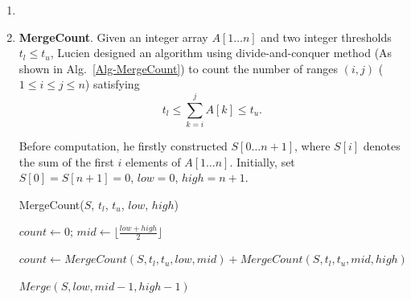 \documentclass[12pt,a4paper]{article}
\makeatletter
\newtheorem*{solution}{Solution}
\theoremstyle{definition}
\renewenvironment{solution}[1][Solution] {\par\pushQED{\qed}\normalfont\topsep6\p@\@plus6\p@\relax\trivlist\item[\hskip\labelsep\bfseries#1\@addpunct{.}]\ignorespaces}{\popQED\endtrivlist\@endpefalse} \makeatother
\makeatother
\begin{document}
\begin{enumerate}
\begin{solution}
    \end{solution}
    
    
    

    \item
    \textbf{MergeCount}. Given an integer array $A[1 \ldots n]$ and two integer thresholds $t_l \le t_u$, Lucien designed an algorithm using divide-and-conquer method (As shown in Alg.~\ref{Alg-MergeCount}) to count the number of ranges $(i,j)$ ($1 \leq i \leq j \leq n$) satisfying
    \begin{equation}\label{Eqn-MergeCount}
    t_l \leq \sum_{k=i}^{j}{A[k]} \leq t_u.
    \end{equation}

    Before computation, he firstly constructed $S[0 \ldots n+1]$, where $S[i]$ denotes the sum of the first $i$ elements of $A[1 \ldots n]$. Initially, set $S[0]=S[n+1]=0$, $low=0$, $high=n+1$.

\begin{minipage}[t]{0.90\textwidth}
	\begin{algorithm}[H]
		\BlankLine
		\caption{MergeCount($S$, $t_l$, $t_u$, $low$, $high$)}
		\label{Alg-MergeCount}
		
		$count \leftarrow 0$; $mid\leftarrow \lfloor \frac{low+high}{2} \rfloor$\;
		
		
		$count\leftarrow MergeCount(S, t_l, t_u, low, mid)+ MergeCount(S, t_l, t_u, mid, high)$\;
		
		$Merge(S,low,mid-1,high-1)$  
		

\end{algorithm}
\end{minipage}
\end{enumerate}
\end{document}
